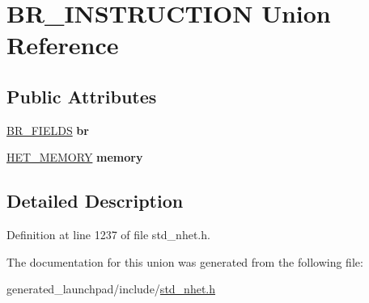 \hypertarget{unionBR__INSTRUCTION}{}\section{B\+R\+\_\+\+I\+N\+S\+T\+R\+U\+C\+T\+I\+ON Union Reference}
\label{unionBR__INSTRUCTION}
\subsection*{Public Attributes}
\begin{DoxyCompactItemize}
\item 
\mbox{\label{unionBR__INSTRUCTION_a34306672dbc4bf19ffab83bad9c8d91e}} 
\mbox{\hyperlink{structbr__format}{B\+R\+\_\+\+F\+I\+E\+L\+DS}} {\bfseries br}
\item 
\mbox{\label{unionBR__INSTRUCTION_ab88276f67ca41f1c3fb408d27b232e7b}} 
\mbox{\hyperlink{structmemory__format}{H\+E\+T\+\_\+\+M\+E\+M\+O\+RY}} {\bfseries memory}
\end{DoxyCompactItemize}


\subsection{Detailed Description}


Definition at line 1237 of file std\+\_\+nhet.\+h.



The documentation for this union was generated from the following file\+:\begin{DoxyCompactItemize}
\item 
generated\+\_\+launchpad/include/\mbox{\hyperlink{std__nhet_8h}{std\+\_\+nhet.\+h}}\end{DoxyCompactItemize}
